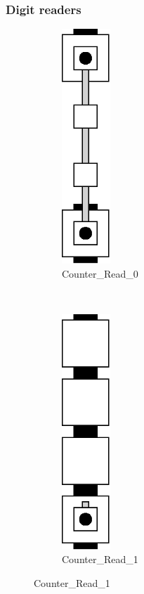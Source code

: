     \subsubsection{ Digit readers }
    \begin{figure}[H]
        \centering
        \begin{subfigure}[t]{0.2\textwidth}
            \centering
            \includegraphics[width=0.2\textwidth]{read/read_0}
            \caption{\label{fig:read/read_1} Counter\_Read\_0}
        \end{subfigure}%
        ~
        \begin{subfigure}[t]{0.2\textwidth}
            \centering
            \includegraphics[width=0.2\textwidth]{read/read_1}
            \caption{\label{fig:read/read_1} Counter\_Read\_1}
        \end{subfigure}%
    \end{figure}

